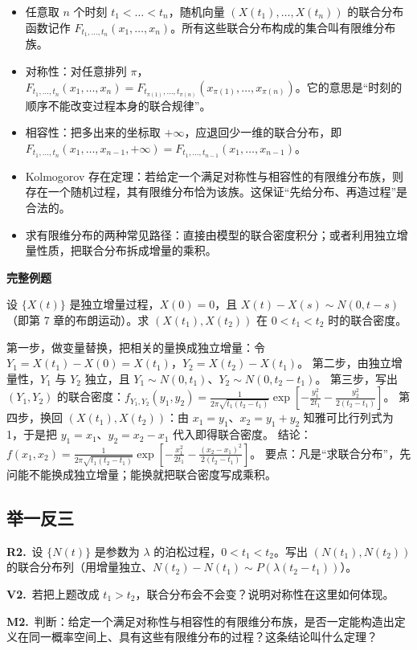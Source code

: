 \documentclass[UTF8,a4paper,11pt]{ctexart}
\newcommand{\CompactQuestion}[2]{\par\noindent\textbf{#1.}\ #2\par\vspace{.8em}}
\begin{document}
\begin{itemize}
\item 任意取 $n$ 个时刻 $t_1<\dots<t_n$，随机向量 $(X(t_1),\dots,X(t_n))$ 的联合分布函数记作 $F_{t_1,\dots,t_n}(x_1,\dots,x_n)$。所有这些联合分布构成的集合叫有限维分布族。
\item 对称性：对任意排列 $\pi$，$F_{t_1,\dots,t_n}(x_1,\dots,x_n)=F_{t_{\pi(1)},\dots,t_{\pi(n)}}(x_{\pi(1)},\dots,x_{\pi(n)})$。它的意思是“时刻的顺序不能改变过程本身的联合规律”。
\item 相容性：把多出来的坐标取 $+\infty$，应退回少一维的联合分布，即 $F_{t_1,\dots,t_n}(x_1,\dots,x_{n-1},+\infty)=F_{t_1,\dots,t_{n-1}}(x_1,\dots,x_{n-1})$。
\item Kolmogorov 存在定理：若给定一个满足对称性与相容性的有限维分布族，则存在一个随机过程，其有限维分布恰为该族。这保证“先给分布、再造过程”是合法的。
\item 求有限维分布的两种常见路径：直接由模型的联合密度积分；或者利用独立增量性质，把联合分布拆成增量的乘积。
\end{itemize}
\textbf{完整例题}

设 $\{X(t)\}$ 是独立增量过程，$X(0)=0$，且 $X(t)-X(s)\sim N(0,t-s)$（即第 7 章的布朗运动）。求 $(X(t_1),X(t_2))$ 在 $0<t_1<t_2$ 时的联合密度。

第一步，做变量替换，把相关的量换成独立增量：令 $Y_1=X(t_1)-X(0)=X(t_1)$，$Y_2=X(t_2)-X(t_1)$。 第二步，由独立增量性，$Y_1$ 与 $Y_2$ 独立，且 $Y_1\sim N(0,t_1)$、$Y_2\sim N(0,t_2-t_1)$。 第三步，写出 $(Y_1,Y_2)$ 的联合密度：$f_{Y_1,Y_2}(y_1,y_2)=\frac{1}{2\pi\sqrt{t_1(t_2-t_1)}}\exp\left[-\frac{y_1^2}{2t_1}-\frac{y_2^2}{2(t_2-t_1)}\right]$。 第四步，换回 $(X(t_1),X(t_2))$：由 $x_1=y_1$、$x_2=y_1+y_2$ 知雅可比行列式为 1，于是把 $y_1=x_1$、$y_2=x_2-x_1$ 代入即得联合密度。 结论：$f(x_1,x_2)=\frac{1}{2\pi\sqrt{t_1(t_2-t_1)}}\exp\left[-\frac{x_1^2}{2t_1}-\frac{(x_2-x_1)^2}{2(t_2-t_1)}\right]$。 要点：凡是“求联合分布”，先问能不能换成独立增量；能换就把联合密度写成乘积。

\subsection{举一反三}
\CompactQuestion{R2}{设 $\{N(t)\}$ 是参数为 $\lambda$ 的泊松过程，$0<t_1<t_2$。写出 $(N(t_1),N(t_2))$ 的联合分布列（用增量独立、$N(t_2)-N(t_1)\sim P(\lambda(t_2-t_1))$）。}
\CompactQuestion{V2}{若把上题改成 $t_1>t_2$，联合分布会不会变？说明对称性在这里如何体现。}
\CompactQuestion{M2}{判断：给定一个满足对称性与相容性的有限维分布族，是否一定能构造出定义在同一概率空间上、具有这些有限维分布的过程？这条结论叫什么定理？}
\clearpage
{}
\end{document}
